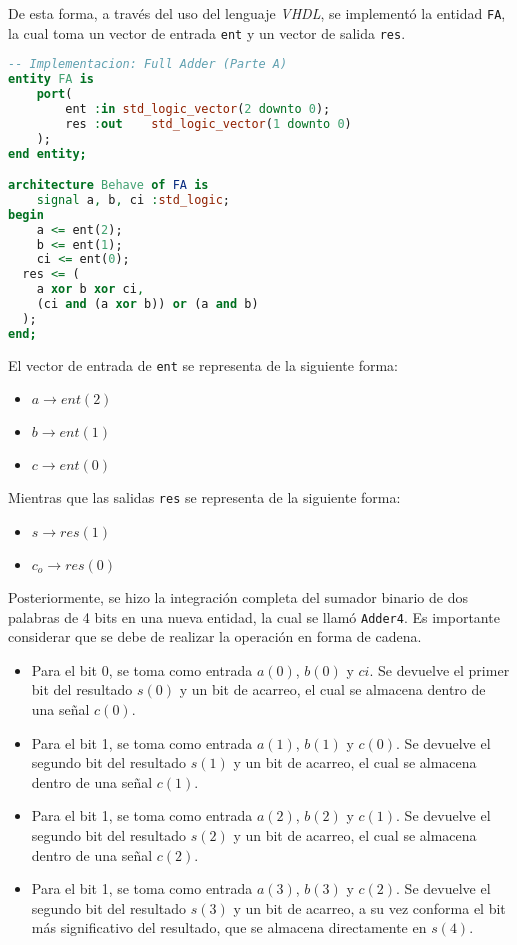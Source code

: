 \documentclass[../procedimientos.tex]{subfiles}
\begin{document}
De esta forma, a través del uso del lenguaje \textit{VHDL}, se implementó la 
entidad \texttt{FA}, la cual toma un vector de entrada \texttt{ent} y un 
vector de salida \texttt{res}.

\begin{lstlisting}[language=VHDL]
-- Implementacion: Full Adder (Parte A)
entity FA is
	port(
		ent	:in	std_logic_vector(2 downto 0);
		res	:out	std_logic_vector(1 downto 0)
	);
end entity;

architecture Behave of FA is
	signal a, b, ci	:std_logic;
begin
	a <= ent(2);
	b <= ent(1);
	ci <= ent(0);
  res <= (
    a xor b xor ci,
    (ci and (a xor b)) or (a and b)
  );
end;
\end{lstlisting}

El vector de entrada de \texttt{ent} se representa de la siguiente forma:
\begin{itemize}
  \item $a \rightarrow ent(2)$
  \item $b \rightarrow ent(1)$
  \item $c \rightarrow ent(0)$
\end{itemize}

Mientras que las salidas \texttt{res} se representa de la siguiente forma:
\begin{itemize}
  \item $s \rightarrow res(1)$
  \item $c_o \rightarrow res(0)$
\end{itemize}

Posteriormente, se hizo la integración completa del sumador binario de dos 
palabras de 4 bits en una nueva entidad, la cual se llamó \texttt{Adder4}. Es 
importante considerar que se debe de realizar la operación en forma de cadena.
\begin{itemize}
  \item Para el bit 0, se toma como entrada $a(0)$, $b(0)$ y $ci$. Se devuelve 
    el primer bit del resultado $s(0)$ y un bit de acarreo, el cual se 
    almacena dentro de una señal $c(0)$.
  \item Para el bit 1, se toma como entrada $a(1)$, $b(1)$ y $c(0)$. Se 
    devuelve el segundo bit del resultado $s(1)$ y un bit de acarreo, el cual 
    se almacena dentro de una señal $c(1)$.
  \item Para el bit 1, se toma como entrada $a(2)$, $b(2)$ y $c(1)$. Se 
    devuelve el segundo bit del resultado $s(2)$ y un bit de acarreo, el cual 
    se almacena dentro de una señal $c(2)$.
  \item Para el bit 1, se toma como entrada $a(3)$, $b(3)$ y $c(2)$. Se 
    devuelve el segundo bit del resultado $s(3)$ y un bit de acarreo, a su vez 
    conforma el bit más significativo del resultado, que se almacena 
    directamente en $s(4)$.
\end{itemize}
\end{document}
